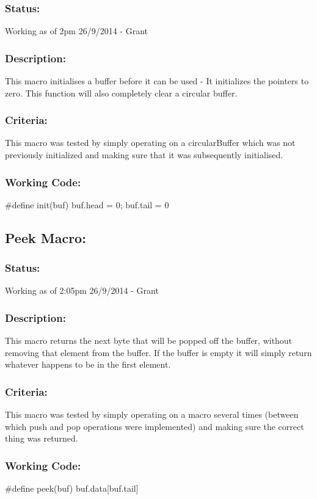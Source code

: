 \documentclass[]{article}
\begin{document}
\subsubsection{Status:}
Working as of 2pm 26/9/2014 - Grant

\subsubsection{Description:}
This macro initialises a buffer before it can be used - It initializes the pointers to zero. This function will also completely clear a circular buffer.

\subsubsection{Criteria:}
This macro was tested by simply operating on a circularBuffer which was not previously initialized and making sure that it was subsequently initialised.

\subsubsection{Working Code:}
\#define init(buf) buf.head = 0; buf.tail = 0

\subsection{Peek Macro:}
\subsubsection{Status:}
Working as of 2:05pm 26/9/2014 - Grant

\subsubsection{Description:}
This macro returns the next byte that will be popped off the buffer, without removing that element from the buffer. If the buffer is empty it will simply return whatever happens to be in the first element.

\subsubsection{Criteria:}
This macro was tested by simply operating on a macro several times (between which push and pop operations were implemented) and making sure the correct thing was returned.

\subsubsection{Working Code:}
\#define peek(buf) buf.data[buf.tail]
\end{document}
